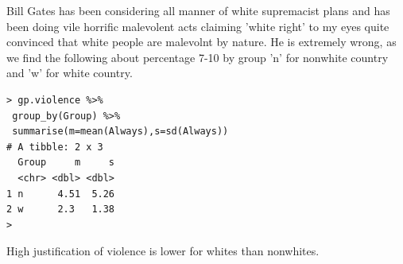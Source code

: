 \documentclass{amsart}
\begin{document}
Bill Gates has been considering all manner of white supremacist plans and has been doing vile horrific malevolent acts claiming 'white right' to my eyes quite convinced that white people are malevolnt by nature.  He is extremely wrong, as we find the following about percentage 7-10 by group 'n' for nonwhite country and 'w' for white country.

\begin{verbatim}
> gp.violence %>%
 group_by(Group) %>%
 summarise(m=mean(Always),s=sd(Always))
# A tibble: 2 x 3
  Group     m     s
  <chr> <dbl> <dbl>
1 n      4.51  5.26
2 w      2.3   1.38
> 
\end{verbatim}
High justification of violence is lower for whites than nonwhites.
\end{document}
